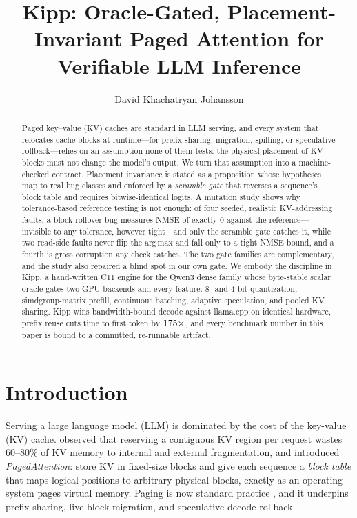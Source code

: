 \documentclass[sigconf,nonacm,screen]{acmart}
\begin{document}
\title{Kipp: Oracle-Gated, Placement-Invariant Paged Attention for
Verifiable LLM Inference}
\author{David Khachatryan Johansson}

\begin{abstract}
Paged key--value (KV) caches are standard in LLM serving, and every system
that relocates cache blocks at runtime---for prefix sharing, migration,
spilling, or speculative rollback---relies on an assumption none of them
tests: the physical placement of KV blocks must not change the model's
output. We turn that assumption into a machine-checked contract. Placement
invariance is stated as a proposition whose hypotheses map to real bug
classes and enforced by a \emph{scramble gate} that reverses a sequence's
block table and requires bitwise-identical logits. A mutation study shows
why tolerance-based reference testing is not enough: of four seeded,
realistic KV-addressing faults, a block-rollover bug measures NMSE of
exactly $0$ against the reference---invisible to any tolerance, however
tight---and only the scramble gate catches it, while two read-side faults
never flip the arg\,max and fall only to a tight NMSE bound, and a fourth
is gross corruption any check catches. The two gate families are
complementary, and the study also repaired a blind spot in
our own gate. We embody the discipline in Kipp, a hand-written C11 engine
for the Qwen3 dense family whose byte-stable scalar oracle gates two GPU
backends and every feature: 8- and 4-bit quantization, simdgroup-matrix
prefill, continuous batching, adaptive speculation, and pooled KV sharing.
Kipp wins bandwidth-bound decode against llama.cpp on identical hardware,
prefix reuse cuts time to first token by $175\times$, and every
benchmark number in this paper is bound to a committed, re-runnable
artifact.
\end{abstract}

\maketitle

\section{Introduction}
\label{sec:intro}
Serving a large language model (LLM) is dominated by the cost of the
key-value (KV) cache. \citet{kwon2023pagedattention} observed that reserving
a contiguous KV region per request wastes $60$--$80\%$ of KV memory to
internal and external fragmentation, and introduced \emph{PagedAttention}:
store KV in fixed-size blocks and give each sequence a \emph{block table}
that maps logical positions to arbitrary physical blocks, exactly as an
operating system pages virtual memory. Paging is now standard practice
\citep{kwon2023pagedattention,zheng2024sglang,miao2024servingsurvey}, and it
underpins prefix sharing, live block migration, and speculative-decode
rollback.
\end{document}
